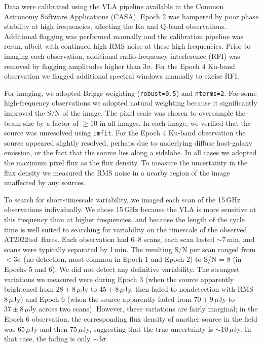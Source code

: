 \documentclass{nature_plusfigure}
\newcommand{\at}{AT2022tsd}
\begin{document}
\begin{methods}
Data were calibrated using the VLA pipeline available in the Common Astronomy Software Applications (CASA\cite{McMullin2007}).
Epoch 2 was hampered by poor phase stability at high frequencies, affecting the Ka and Q-band observations. Additional flagging was performed manually and the calibration pipeline was rerun, albeit with continued high RMS noise at these high frequencies.
Prior to imaging each observation, additional radio-frequency interference (RFI) was removed by flagging amplitudes higher than $3\sigma$.
For the Epoch 4 Ku-band observation we flagged additional spectral windows manually to excise RFI.

For imaging, we adopted Briggs weighting (\texttt{robust=0.5}) and \texttt{nterms=2}. For some high-frequency observations we adopted natural weighting because it significantly improved the S/N of the image.
The pixel scale was chosen to oversample the beam size by a factor of $\geq10$ in all images.
In each image, we verified that the source was unresolved using \texttt{imfit}.
For the Epoch 4 Ku-band observation the source appeared slightly resolved, perhaps due to underlying diffuse host-galaxy emission, or the fact that the source lies along a sidelobe.
In all cases we adopted the maximum pixel flux as the flux density.
To measure the uncertainty in the flux density we measured the RMS noise in a nearby region of the image unaffected by any sources.

To search for short-timescale variability, we imaged each scan of the 15\,GHz observations individually. We chose 15\,GHz because the VLA is more sensitive at this frequency than at higher frequencies, and because the length of the cycle time is well suited to searching for variability on the timescale of the observed \at\ flares. Each observation had 6--8 scans, each scan lasted $\sim 7$\,min, and scans were typically separated by 1\,min. The resulting S/N per scan ranged from $<3\sigma$ (no detection, most common in Epoch 1 and Epoch 2) to S/N = 8 (in Epochs 5 and 6).
We did not detect any definitive variability. The strongest variations we measured were during Epoch 3 (when the source apparently brightened from $28\pm8\,\mu$Jy to $45\pm8\,\mu$Jy, then faded to nondetection with RMS $8\,\mu$Jy) and Epoch 6 (when the source apparently faded from $70\pm9\,\mu$Jy to $37\pm8\,\mu$Jy across two scans). However, these variations are fairly marginal; in the Epoch 6 observation, the corresponding flux density of another source in the field was $65\,\mu$Jy and then $75\,\mu$Jy, suggesting that the true uncertainty is $\sim 10\,$$\mu$Jy. In that case, the fading is only $\sim 3\sigma$.


\end{methods}
\end{document}
